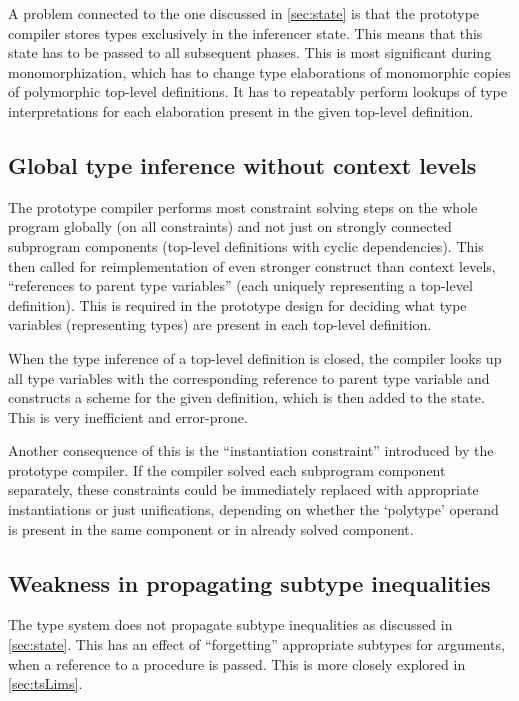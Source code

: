 A problem connected to the one discussed in \cref{sec:state} is that the prototype compiler stores types exclusively in the inferencer state. This means that this state has to be passed to all subsequent phases. This is most significant during monomorphization, which has to change type elaborations of monomorphic copies of polymorphic top-level definitions. It has to repeatably perform lookups of type interpretations for each elaboration present in the given top-level definition.

\subsection{Global type inference without context levels}
\label{sec:global}

The prototype compiler performs most constraint solving steps on the whole program globally (on all constraints) and not just on strongly connected subprogram components (top-level definitions with cyclic dependencies). This then called for reimplementation of even stronger construct than context levels, ``references to parent type variables'' (each uniquely representing a top-level definition). This is required in the prototype design for deciding what type variables (representing types) are present in each top-level definition.

When the type inference of a top-level definition is closed, the compiler looks up all type variables with the corresponding reference to parent type variable and constructs a scheme for the given definition, which is then added to the state. This is very inefficient and error-prone.

Another consequence of this is the ``instantiation constraint'' introduced by the prototype compiler. If the compiler solved each subprogram component separately, these constraints could be immediately replaced with appropriate instantiations or just unifications, depending on whether the `polytype' operand is present in the same component or in already solved component.

\subsection{Weakness in propagating subtype inequalities}
\label{sec:weakness}

The type system does not propagate subtype inequalities as discussed in \cref{sec:state}. This has an effect of ``forgetting'' appropriate subtypes for arguments, when a reference to a procedure is passed. This is more closely explored in \cref{sec:tsLims}.

